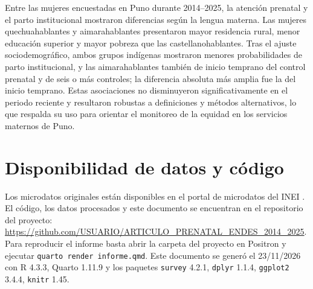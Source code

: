\documentclass[
  spanish,
  letterpaper,
  conference]{IEEEtran}
\begin{document}
Entre las mujeres encuestadas en Puno durante 2014--2025, la atención
prenatal y el parto institucional mostraron diferencias según la lengua
materna. Las mujeres quechuahablantes y aimarahablantes presentaron
mayor residencia rural, menor educación superior y mayor pobreza que las
castellanohablantes. Tras el ajuste sociodemográfico, ambos grupos
indígenas mostraron menores probabilidades de parto institucional, y las
aimarahablantes también de inicio temprano del control prenatal y de
seis o más controles; la diferencia absoluta más amplia fue la del
inicio temprano. Estas asociaciones no disminuyeron significativamente
en el periodo reciente y resultaron robustas a definiciones y métodos
alternativos, lo que respalda su uso para orientar el monitoreo de la
equidad en los servicios maternos de Puno.

\section{Disponibilidad de datos y
código}\label{disponibilidad-de-datos-y-cuxf3digo}

Los microdatos originales están disponibles en el portal de microdatos
del INEI \citep{inei2025}. El código, los datos procesados y este
documento se encuentran en el repositorio del proyecto:
\url{https://github.com/USUARIO/ARTICULO_PRENATAL_ENDES_2014_2025}. Para
reproducir el informe basta abrir la carpeta del proyecto en Positron y
ejecutar \texttt{quarto render informe.qmd}. Este documento se generó el
23/11/2026 con R 4.3.3, Quarto 1.11.9 y los paquetes \texttt{survey}
4.2.1, \texttt{dplyr} 1.1.4, \texttt{ggplot2} 3.4.4, \texttt{knitr}
1.45.



\end{document}

